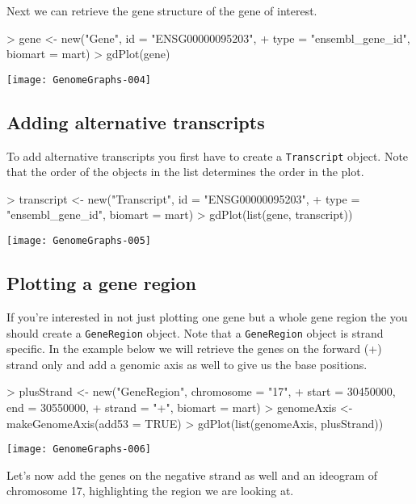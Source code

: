 \documentclass[11pt]{article}
\newcommand{\Robject}[1]{{\texttt{#1}}}
\begin{document}
Next we can retrieve the gene structure of the gene of interest.

\begin{Schunk}
\begin{Sinput}
> gene <- new("Gene", id = "ENSG00000095203", 
+     type = "ensembl_gene_id", biomart = mart)
> gdPlot(gene)
\end{Sinput}
\end{Schunk}
\texttt{[image: GenomeGraphs-004]}

\subsection{Adding alternative transcripts}

To add alternative transcripts you first have to create a \Robject{Transcript} object.
Note that the order of the objects in the list determines the order in the plot.
\begin{Schunk}
\begin{Sinput}
> transcript <- new("Transcript", id = "ENSG00000095203", 
+     type = "ensembl_gene_id", biomart = mart)
> gdPlot(list(gene, transcript))
\end{Sinput}
\end{Schunk}
\texttt{[image: GenomeGraphs-005]}

\subsection{Plotting a gene region}

If you're interested in not just plotting one gene but a whole gene
region the you should create a \Robject{GeneRegion} object.  Note that
a \Robject{GeneRegion} object is strand specific.  In the example
below we will retrieve the genes on the forward (+) strand only and
add a genomic axis as well to give us the base positions.

\begin{Schunk}
\begin{Sinput}
> plusStrand <- new("GeneRegion", chromosome = "17", 
+     start = 30450000, end = 30550000, 
+     strand = "+", biomart = mart)
> genomeAxis <- makeGenomeAxis(add53 = TRUE)
> gdPlot(list(genomeAxis, plusStrand))
\end{Sinput}
\end{Schunk}
\texttt{[image: GenomeGraphs-006]}

Let's now add the genes on the negative strand as well and an ideogram
of chromosome 17, highlighting the region we are looking at.
\end{document}
